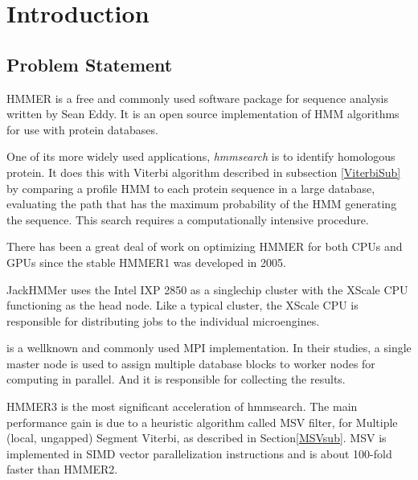 
\chapter{Introduction} %



\section{Problem Statement}

HMMER \citep{HMMER} is a free and commonly used software package for sequence analysis written by Sean Eddy. 
It is an open source implementation of HMM algorithms for use with protein databases.

One of its more widely used applications, \emph{hmmsearch} is to identify homologous protein. It does this with Viterbi algorithm described in subsection \ref{ViterbiSub} by comparing a profile HMM to each protein sequence in a large database, evaluating the path that has the maximum probability of the HMM generating the sequence.
This search requires a computationally intensive procedure.

There has been a great deal of work on optimizing HMMER for both CPUs and GPUs since the stable HMMER1 was developed in 2005. 

JackHMMer \citep{Wun} uses the Intel IXP 2850 as a singlechip cluster with the XScale CPU functioning as the head node. Like a typical cluster, the XScale CPU is responsible for distributing jobs to the individual microengines. 

\citep{Walters2006} is a wellknown and commonly used MPI implementation. In their studies, a single master node is used to assign multiple database blocks to worker nodes for computing in parallel. And it is responsible for collecting the results.

HMMER3 \citep{HMMER3} is the most significant acceleration of hmmsearch. The main performance gain is due to a heuristic algorithm called MSV filter, for Multiple (local, ungapped) Segment Viterbi, as described in Section\ref{MSVsub}. MSV is implemented in SIMD vector parallelization instructions and is about 100-fold faster than HMMER2.

